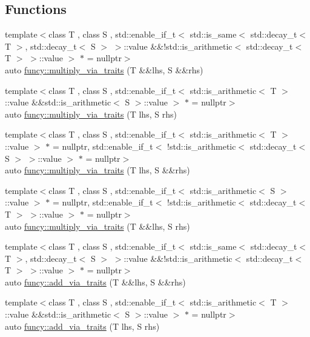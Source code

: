 \subsection*{Functions}
\begin{DoxyCompactItemize}
\item 
{\footnotesize template$<$class T , class S , std\-::enable\-\_\-if\-\_\-t$<$ std\-::is\-\_\-same$<$ std\-::decay\-\_\-t$<$ T $>$, std\-::decay\-\_\-t$<$ S $>$ $>$\-::value \&\&!std\-::is\-\_\-arithmetic$<$ std\-::decay\-\_\-t$<$ T $>$ $>$\-::value $>$ $\ast$  = nullptr$>$ }\\auto \hyperlink{namespacefuncy_a804d61bb279c15a77dc98956e663feaf}{funcy\-::multiply\-\_\-via\-\_\-traits} (T \&\&lhs, S \&\&rhs)
\item 
{\footnotesize template$<$class T , class S , std\-::enable\-\_\-if\-\_\-t$<$ std\-::is\-\_\-arithmetic$<$ T $>$\-::value \&\&std\-::is\-\_\-arithmetic$<$ S $>$\-::value $>$ $\ast$  = nullptr$>$ }\\auto \hyperlink{namespacefuncy_a371e053ebe310dfc6202518080660abd}{funcy\-::multiply\-\_\-via\-\_\-traits} (T lhs, S rhs)
\item 
{\footnotesize template$<$class T , class S , std\-::enable\-\_\-if\-\_\-t$<$ std\-::is\-\_\-arithmetic$<$ T $>$\-::value $>$ $\ast$  = nullptr, std\-::enable\-\_\-if\-\_\-t$<$ !std\-::is\-\_\-arithmetic$<$ std\-::decay\-\_\-t$<$ S $>$ $>$\-::value $>$ $\ast$  = nullptr$>$ }\\auto \hyperlink{namespacefuncy_a998d1087655f9455557ccf5e73f9a9a6}{funcy\-::multiply\-\_\-via\-\_\-traits} (T lhs, S \&\&rhs)
\item 
{\footnotesize template$<$class T , class S , std\-::enable\-\_\-if\-\_\-t$<$ std\-::is\-\_\-arithmetic$<$ S $>$\-::value $>$ $\ast$  = nullptr, std\-::enable\-\_\-if\-\_\-t$<$ !std\-::is\-\_\-arithmetic$<$ std\-::decay\-\_\-t$<$ T $>$ $>$\-::value $>$ $\ast$  = nullptr$>$ }\\auto \hyperlink{namespacefuncy_a43e10ef491a1b917c3d63d8f119a061f}{funcy\-::multiply\-\_\-via\-\_\-traits} (T \&\&lhs, S rhs)
\item 
{\footnotesize template$<$class T , class S , std\-::enable\-\_\-if\-\_\-t$<$ std\-::is\-\_\-same$<$ std\-::decay\-\_\-t$<$ T $>$, std\-::decay\-\_\-t$<$ S $>$ $>$\-::value \&\&!std\-::is\-\_\-arithmetic$<$ std\-::decay\-\_\-t$<$ T $>$ $>$\-::value $>$ $\ast$  = nullptr$>$ }\\auto \hyperlink{namespacefuncy_a2582aac1c2d3dee4cbd9995d9bf068fc}{funcy\-::add\-\_\-via\-\_\-traits} (T \&\&lhs, S \&\&rhs)
\item 
{\footnotesize template$<$class T , class S , std\-::enable\-\_\-if\-\_\-t$<$ std\-::is\-\_\-arithmetic$<$ T $>$\-::value \&\&std\-::is\-\_\-arithmetic$<$ S $>$\-::value $>$ $\ast$  = nullptr$>$ }\\auto \hyperlink{namespacefuncy_a719edd142cb5aa7d10fc9a7c59c52fbc}{funcy\-::add\-\_\-via\-\_\-traits} (T lhs, S rhs)
\end{DoxyCompactItemize}
